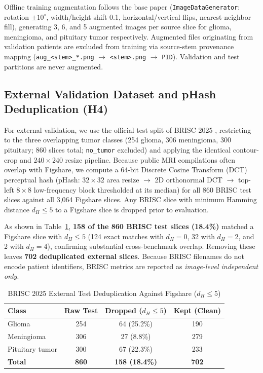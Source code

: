 \documentclass[conference]{IEEEtran}
\begin{document}
Offline training augmentation follows the base paper (\texttt{ImageDataGenerator}: rotation $\pm 10^\circ$, width/height shift 0.1, horizontal/vertical flips, nearest-neighbor fill), generating 3, 6, and 5 augmented images per source slice for glioma, meningioma, and pituitary tumor respectively. Augmented files originating from validation patients are excluded from training via source-stem provenance mapping (\texttt{aug\_<stem>\_*.png} $\to$ \texttt{<stem>.png} $\to$ \texttt{PID}). Validation and test partitions are never augmented.

\subsection{External Validation Dataset and pHash Deduplication (H4)}
For external validation, we use the official test split of BRISC 2025 \cite{fateh2025brisc}, restricting to the three overlapping tumor classes (254 glioma, 306 meningioma, 300 pituitary; 860 slices total; \texttt{no\_tumor} excluded) and applying the identical contour-crop and $240\times240$ resize pipeline. Because public MRI compilations often overlap with Figshare, we compute a 64-bit Discrete Cosine Transform (DCT) perceptual hash (pHash: $32\times32$ area resize $\to$ 2D orthonormal DCT $\to$ top-left $8\times8$ low-frequency block thresholded at its median) for all 860 BRISC test slices against all 3,064 Figshare slices. Any BRISC slice with minimum Hamming distance $d_H \le 5$ to a Figshare slice is dropped prior to evaluation.

As shown in Table~\ref{tab:dedupe}, \textbf{158 of the 860 BRISC test slices (18.4\%)} matched a Figshare slice with $d_H \le 5$ (124 exact matches with $d_H=0$, 32 with $d_H=2$, and 2 with $d_H=4$), confirming substantial cross-benchmark overlap. Removing these leaves \textbf{702 deduplicated external slices}. Because BRISC filenames do not encode patient identifiers, BRISC metrics are reported as \textit{image-level independent only}.

\begin{table}[htbp]
\caption{BRISC 2025 External Test Deduplication Against Figshare ($d_H \le 5$)}
\label{tab:dedupe}
\centering
\begin{tabular}{lccc}
\toprule
\textbf{Class} & \textbf{Raw Test} & \textbf{Dropped ($d_H \le 5$)} & \textbf{Kept (Clean)} \\
\midrule
Glioma          & 254 &  64 (25.2\%) & 190 \\
Meningioma      & 306 &  27 (8.8\%)  & 279 \\
Pituitary tumor & 300 &  67 (22.3\%) & 233 \\
\midrule
\textbf{Total}  & \textbf{860} & \textbf{158 (18.4\%)} & \textbf{702} \\
\bottomrule
\end{tabular}
\end{table}
\end{document}

